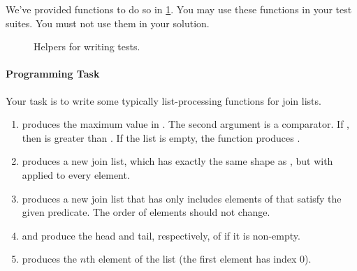 We've provided functions to do so in \cref{joinlist_tests}.
You may use these functions in your test suites. You must not use them in your
solution.

\begin{figure}
\caption{Helpers for writing tests.}
\label{joinlist_tests}
\end{figure}

\paragraph{Programming Task}

Your task is to write some typically list-processing functions for join lists.

\begin{enumerate}

\item {} produces the maximum value in
  . The second argument is a comparator. If
  , then  is greater than
  . If the list is empty, the function produces
   .

\item {} produces a new join list, which has exactly the same
 shape as , but with  applied to every element.

\item {} produces a new join list that has only
  includes elements of  that satisfy the given predicate.
  The order of elements should not change.

\item {} and  produce the head and tail, respectively,
   of  if it is non-empty.

\item {} produces the $n$th element of the list (the first element has index 0).

\end{enumerate}


